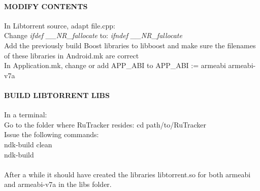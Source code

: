 \paragraph{MODIFY CONTENTS}
In Libtorrent source, adapt file.cpp: \\
Change \emph{ifdef \_\_NR\_fallocate} to: \emph{ifndef \_\_NR\_fallocate}\\

Add the previously build Boost libraries to libboost and make sure the filenames of these libraries in Android.mk are correct\\
In Application.mk, change or add APP\_ABI to APP\_ABI := armeabi armeabi-v7a\\

\paragraph{BUILD LIBTORRENT LIBS}
In a terminal:\\
Go to the folder where RuTracker resides: cd path/to/RuTracker\\
Issue the following commands:\\
ndk-build clean\\
ndk-build\\
\\
After a while it should have created the libraries libtorrent.so for both armeabi and armeabi-v7a in the libs folder.\\